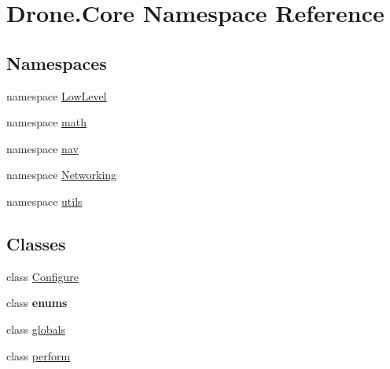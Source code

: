 \hypertarget{namespace_drone_1_1_core}{}\section{Drone.\+Core Namespace Reference}
\label{namespace_drone_1_1_core}
\subsection*{Namespaces}
\begin{DoxyCompactItemize}
\item 
namespace \hyperlink{namespace_drone_1_1_core_1_1_low_level}{Low\+Level}
\item 
namespace \hyperlink{namespace_drone_1_1_core_1_1math}{math}
\item 
namespace \hyperlink{namespace_drone_1_1_core_1_1nav}{nav}
\item 
namespace \hyperlink{namespace_drone_1_1_core_1_1_networking}{Networking}
\item 
namespace \hyperlink{namespace_drone_1_1_core_1_1utils}{utils}
\end{DoxyCompactItemize}
\subsection*{Classes}
\begin{DoxyCompactItemize}
\item 
class \hyperlink{class_drone_1_1_core_1_1_configure}{Configure}
\item 
class {\bfseries enums}
\item 
class \hyperlink{class_drone_1_1_core_1_1globals}{globals}
\item 
class \hyperlink{class_drone_1_1_core_1_1perform}{perform}
\end{DoxyCompactItemize}
